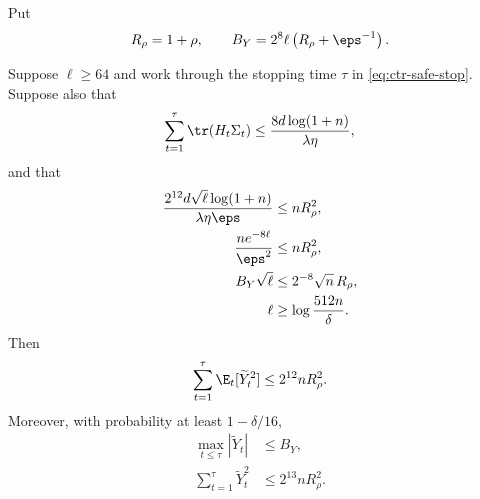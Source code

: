 Put
\begin{align}
    R_\rho=1+\rho,
    \qquad
    B_Y=2^8\ell\left(R_\rho+\eps^{-1}\right).
    \label{eq:ctr-feedback-scales}
\end{align}

\begin{lemma}
    \label{lem:ctr-feedback}
    Suppose $\ell\geq64$ and work through the stopping time $\tau$ in
    \eqref{eq:ctr-safe-stop}.  Suppose also that
    \begin{align}
        \sum_{t=1}^{\tau}\tr(H_t\Sigma_t)
        \leq\frac{8d\log(1+n)}{\lambda\eta},
        \label{eq:ctr-feedback-trace-input}
    \end{align}
    and that
    \begin{align}
        \frac{2^{12}d\sqrt\ell\log(1+n)}
        {\lambda\eta\eps}
             & \leq nR_\rho^2,
        \label{eq:ctr-feedback-param-a}
        \\
        \frac{ne^{-8\ell}}{\eps^2}
             & \leq nR_\rho^2,
        \label{eq:ctr-feedback-param-b}
        \\
        B_Y\sqrt\ell
             & \leq2^{-8}\sqrt n\,R_\rho,
        \label{eq:ctr-feedback-param-c}
        \\
        \ell & \geq\log\frac{512n}{\delta}.
        \label{eq:ctr-feedback-param-d}
    \end{align}
    Then
    \begin{align}
        \sum_{t=1}^{\tau}\E_t[\widetilde Y_t^2]
        \leq2^{12}nR_\rho^2.
        \label{eq:ctr-predictable-Y2}
    \end{align}
    Moreover, with probability at least $1-\delta/16$,
    \begin{align}
        \max_{t\leq\tau}|\widetilde Y_t|
         & \leq B_Y,
        \label{eq:ctr-Y-maximum}
        \\
        \sum_{t=1}^{\tau}\widetilde Y_t^2
         & \leq2^{13}nR_\rho^2.
        \label{eq:ctr-realised-Y2}
    \end{align}
\end{lemma}


